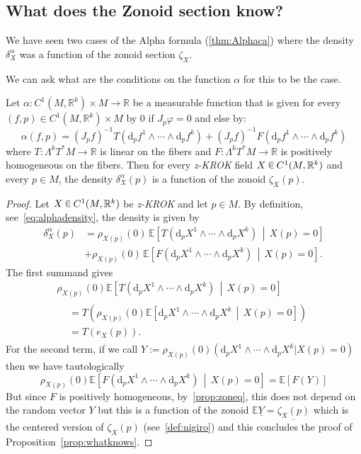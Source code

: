 \documentclass[AHL, Unicode, longabstracts, published]{cedram}
\newcommand{\R}{\mathbb{R}}
\newcommand{\EE}{\mathbb{E}}
\newcommand{\dd}{\mathrm{d}}
\newcommand{\seg}{\underline}
\newcommand{\zkrok}{\emph{z-KROK}\xspace}
\newcommand*\randin{
\mathchoice {\raisebox{-.35ex}{$\displaystyle{^\subset}$}\mkern-11.5mu\raisebox{+.45ex}{$\displaystyle{_\subset}$}} {\mkern+1mu\raisebox{-.27ex}{$\textstyle{^\subset}$}\mkern-11.7mu\raisebox{+.45ex}{$\textstyle{_\subset}$}} {\raisebox{.35ex}{$\scriptstyle\subset$}\mkern-14mu\raisebox{-.15ex}{$\scriptstyle\subset$}} {\raisebox{.3ex}{$\scriptscriptstyle\subset$}\mkern-13.5mu\raisebox{-.10ex}{$\scriptscriptstyle\subset$}}}
\begin{document}
\subsection{What does the Zonoid section know?}\label{sub:whatdoesitknow}
We have seen two cases of the Alpha formula (\cref{thm:Alphaca}) where the density $\delta^\alpha_X$ was a function of the zonoid section $\zeta_X$.

We can ask what are the conditions on the function $\alpha$ for this to be the case.

\begin{prop}\label{prop:whatknows}
Let $\alpha:C^1(M,\R^k)\times M\to \R$ be a measurable function that is given for every $(f,p)\in C^1(M,\R^k)\times M$ by $0$ if $J_p\varphi=0$ and else by:
\begin{equation}
\alpha(f,p)= (J_pf)^{-1}T\left(\dd_pf^1\wedge \cdots\wedge \dd_pf^k\right)+(J_pf)^{-1}F\left(\dd_pf^1\wedge \cdots\wedge \dd_pf^k\right)
\end{equation}
where $T:\Lambda^kT^*M\to \R$ is linear on the fibers and $F:\Lambda^kT^*M\to \R$ is positively homogeneous on the fibers. Then for every \zkrok field $X\,\randin\, C^1(M,\R^k)$ and every $p\in M$, the density $\delta_X^\alpha(p)$ is a function of the zonoid $\zeta_X(p)$.
\end{prop}

\begin{proof}
Let $X\,\randin\, C^1(M,\R^k)$ be \zkrok and let $p\in M$. By definition, see~\eqref{eq:alphadensity}, the density is given by
\begin{align*}
\delta_X^\alpha(p) &=\rho_{X(p)}(0)\, \EE\left[T\left(\dd_pX^1\wedge \cdots\wedge \dd_pX^k\right)\,\middle|\,X(p)=0\right] \\
&+\rho_{X(p)}(0)\, \EE\left[F\left(\dd_pX^1\wedge \cdots\wedge \dd_pX^k\right)\,\middle|\,X(p)=0\right].
\end{align*}
The first summand gives
\begin{multline}
\rho_{X(p)}(0)\EE\left[T\left(\dd_pX^1\wedge \cdots\wedge \dd_pX^k\right)\,\middle|\,X(p)=0\right]\\
\begin{aligned}
&=T\left(\rho_{X(p)}(0)\EE\left[\dd_pX^1\wedge \cdots\wedge \dd_pX^k\,\middle|\,X(p)=0\right]\right) \\
&=T(e_X(p)).
\end{aligned}
\end{multline}
For the second term, if we call $Y:=\rho_{X(p)}(0)(\dd_pX^1\wedge \cdots\wedge \dd_pX^k|X(p)=0)$ then we have tautologically
\begin{equation*}
\rho_{X(p)}(0)\EE\left[F\left(\dd_pX^1\wedge \cdots\wedge \dd_pX^k\right)\,\middle|\,X(p)=0\right]=\EE\left[F(Y)\right]
\end{equation*}
But since $F$ is positively homogeneous, by~\cref{prop:zoneq}, this does not depend on the random vector $Y$ but this is a function of the zonoid $\EE\seg{Y}=\seg{\zeta_X(p)}$ which is the centered version of $\zeta_X(p)$ (see~\cref{def:nigiro}) and this concludes the proof of Proposition~\ref{prop:whatknows}.
\end{proof}
\end{document}
